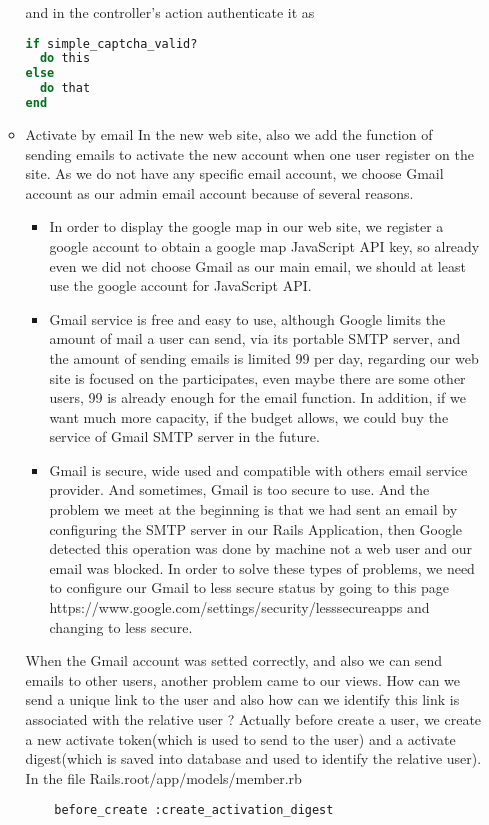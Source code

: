 \begin{enumerate}
\begin{itemize}
and in the controller's action authenticate it as
\begin{lstlisting}[language=Ruby]
if simple_captcha_valid?
  do this
else
  do that
end
\end{lstlisting}
\item{Activate by email}
In the new web site, also we add the function of sending emails to activate the new account when one user register on the site. As we do not have any specific email account, we choose Gmail account as our admin email account because of several reasons.
\begin{itemize}
\item In order to display the google map in our web site, we register a google account to obtain a google map JavaScript API key, so already even we did not choose Gmail as our main email, we should at least use the google account for JavaScript API.
\item Gmail service is free and easy to use, although Google limits the amount of mail a user can send, via its portable SMTP server, and the amount of sending emails is limited 99 per day, regarding our web site is focused on the participates, even maybe there are some other users, 99 is already enough for the email function. In addition, if we want much more capacity, if the budget allows, we could buy the service of Gmail SMTP server in the future.
\item Gmail is secure, wide used and compatible with others email service provider. And sometimes, Gmail is too secure to use. And the problem we meet at the beginning is that we had sent an email by configuring the SMTP server in our Rails Application, then Google detected this operation was done by machine not a web user and our email was blocked. In order to solve these types of problems, we need to configure our Gmail to less secure status by going to this page https://www.google.com/settings/security/lesssecureapps and changing to less secure.
\end{itemize}
When the Gmail account was setted correctly, and also we can send emails to other users, another problem came to our views. How can we send a unique link to the user and also how can we identify this link is associated with the relative user ? Actually before create a user, we create a new activate token(which is used to send to the user) and a activate digest(which is saved into database and used to identify the relative user). 
In the file Rails.root/app/models/member.rb
\begin{lstlisting}
	before_create :create_activation_digest

\end{lstlisting}
\end{itemize}
\end{enumerate}
